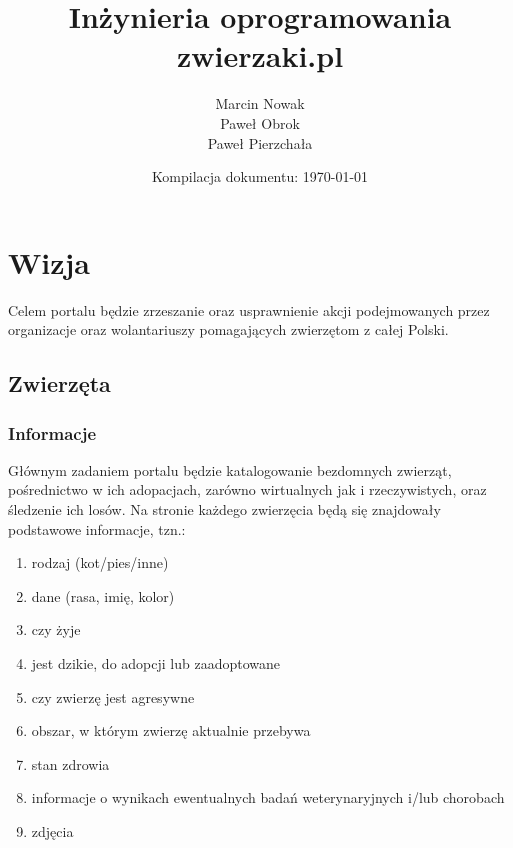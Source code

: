 \documentclass[10pt,a4paper]{article}
\title{Inżynieria oprogramowania\\zwierzaki.pl}
\author{Marcin Nowak\\Paweł Obrok\\Paweł Pierzchała}
\date{Kompilacja dokumentu: \today}
\begin{document}
\maketitle
\clearpage
 
\tableofcontents
\clearpage
 
\section{Wizja}
 
Celem portalu będzie zrzeszanie oraz usprawnienie akcji podejmowanych przez organizacje oraz wolantariuszy pomagających zwierzętom z całej Polski.
 
\subsection{Zwierzęta}
\subsubsection{Informacje}
Głównym zadaniem portalu będzie katalogowanie bezdomnych zwierząt, pośrednictwo w ich adopacjach, zarówno wirtualnych jak i rzeczywistych, oraz śledzenie ich losów. Na stronie każdego zwierzęcia będą się znajdowały podstawowe informacje, tzn.:
\begin{enumerate}
	\item rodzaj (kot/pies/inne)
	\item dane (rasa, imię, kolor)
	\item czy żyje
	\item jest dzikie, do adopcji lub zaadoptowane
	\item czy zwierzę jest agresywne
	\item obszar, w którym zwierzę aktualnie przebywa
	\item stan zdrowia
	\item informacje o wynikach ewentualnych badań weterynaryjnych i/lub chorobach
	\item zdjęcia
\end{enumerate}
\end{document}

